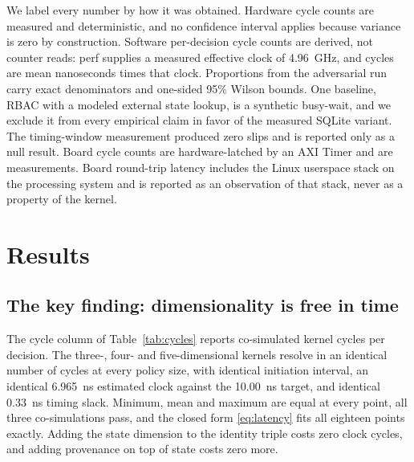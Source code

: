 \documentclass[conference]{IEEEtran}
\newcommand{\new}[1]{#1}
\begin{document}
We label every number by how it was obtained. Hardware cycle counts are measured and deterministic, and no confidence interval applies because variance is zero by construction. Software per-decision cycle counts are derived, not counter reads: perf supplies a measured effective clock of 4.96~GHz, and cycles are mean nanoseconds times that clock. Proportions from the adversarial run carry exact denominators and one-sided 95\% Wilson bounds. One baseline, RBAC with a modeled external state lookup, is a synthetic busy-wait, and we exclude it from every empirical claim in favor of the measured SQLite variant. The timing-window measurement produced zero slips and is reported only as a null result. \new{Board cycle counts are hardware-latched by an AXI Timer and are measurements. Board round-trip latency includes the Linux userspace stack on the processing system and is reported as an observation of that stack, never as a property of the kernel.}

\section{Results}
\label{sec:results}

\subsection{The key finding: dimensionality is free in time}

The cycle column of Table~\ref{tab:cycles} reports co-simulated kernel cycles per decision. The \new{three-, }four- and five-dimensional kernels resolve in an identical number of cycles at every policy size, with identical initiation interval, \new{an identical 6.965~ns estimated clock against the 10.00~ns target, }and identical 0.33~ns timing slack. Minimum, mean and maximum are equal at every point\new{, all three co-simulations pass,} and the closed form \eqref{eq:latency} fits all \new{eighteen} points exactly. \new{Adding the state dimension to the identity triple costs zero clock cycles, and adding provenance on top of state costs zero more.}
\end{document}
